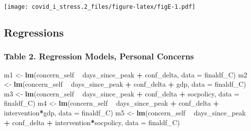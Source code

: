 \documentclass[
]{article}
\newenvironment{Shaded}{\begin{snugshade}}{\end{snugshade}}
\newcommand{\DataTypeTok}[1]{\textcolor[rgb]{0.13,0.29,0.53}{#1}}
\newcommand{\KeywordTok}[1]{\textcolor[rgb]{0.13,0.29,0.53}{\textbf{#1}}}
\newcommand{\NormalTok}[1]{#1}
\newcommand{\OperatorTok}[1]{\textcolor[rgb]{0.81,0.36,0.00}{\textbf{#1}}}
\newcommand{\StringTok}[1]{\textcolor[rgb]{0.31,0.60,0.02}{#1}}
\begin{document}
\texttt{[image: covid\_i\_stress.2\_files/figure-latex/figE-1.pdf]}

\hypertarget{regressions}{%
\subsection{Regressions}\label{regressions}}

\hypertarget{table-2.-regression-models-personal-concerns}{%
\subsubsection{Table 2. Regression Models, Personal
Concerns}\label{table-2.-regression-models-personal-concerns}}

\begin{Shaded}
\begin{Highlighting}[]
\NormalTok{m1 <-}\StringTok{ }\KeywordTok{lm}\NormalTok{(concern_self }\OperatorTok{~}\StringTok{ }\NormalTok{days_since_peak }\OperatorTok{+}\StringTok{ }\NormalTok{conf_delta, }\DataTypeTok{data =}\NormalTok{ finaldf_C)}
\NormalTok{m2 <-}\StringTok{ }\KeywordTok{lm}\NormalTok{(concern_self }\OperatorTok{~}\StringTok{ }\NormalTok{days_since_peak }\OperatorTok{+}\StringTok{ }\NormalTok{conf_delta }\OperatorTok{+}\StringTok{ }\NormalTok{gdp, }\DataTypeTok{data =}\NormalTok{ finaldf_C)}
\NormalTok{m3 <-}\StringTok{ }\KeywordTok{lm}\NormalTok{(concern_self }\OperatorTok{~}\StringTok{ }\NormalTok{days_since_peak }\OperatorTok{+}\StringTok{ }\NormalTok{conf_delta }\OperatorTok{+}\StringTok{ }\NormalTok{socpolicy, }\DataTypeTok{data =}\NormalTok{ finaldf_C)}
\NormalTok{m4 <-}\StringTok{ }\KeywordTok{lm}\NormalTok{(concern_self }\OperatorTok{~}\StringTok{ }\NormalTok{days_since_peak }\OperatorTok{+}\StringTok{ }\NormalTok{conf_delta }\OperatorTok{+}\StringTok{ }\NormalTok{intervention}\OperatorTok{*}\NormalTok{gdp, }\DataTypeTok{data =}\NormalTok{ finaldf_C)}
\NormalTok{m5 <-}\StringTok{ }\KeywordTok{lm}\NormalTok{(concern_self }\OperatorTok{~}\StringTok{ }\NormalTok{days_since_peak }\OperatorTok{+}\StringTok{ }\NormalTok{conf_delta }\OperatorTok{+}\StringTok{ }\NormalTok{intervention}\OperatorTok{*}\NormalTok{socpolicy, }\DataTypeTok{data =}\NormalTok{ finaldf_C)}


\end{Highlighting}
\end{Shaded}
\end{document}
